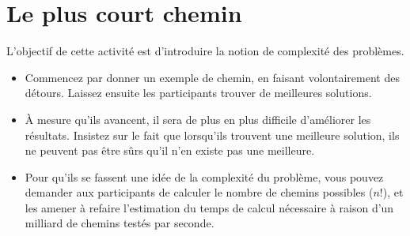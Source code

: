 \documentclass[a5paper,pagesize,DIV=14]{scrbook}
\begin{document}
\section*{Le plus court chemin}

L'objectif de cette activité est d'introduire la notion de complexité des problèmes.

\begin{itemize}
  \item Commencez par donner un exemple de chemin, en faisant volontairement des détours. Laissez ensuite les participants trouver de meilleures solutions. 
  \item À mesure qu'ils avancent, il sera de plus en plus difficile d'améliorer
    les résultats. Insistez sur le fait que lorsqu'ils trouvent une meilleure
    solution, ils ne peuvent pas être sûrs qu'il n'en existe pas une meilleure.
  \item Pour qu'ils se fassent une idée de la complexité du problème, vous pouvez demander aux participants de calculer le nombre de chemins possibles ($n!$), et les amener à refaire l'estimation du temps de calcul nécessaire à raison d'un milliard de chemins testés par seconde.
\end{itemize}
\end{document}
